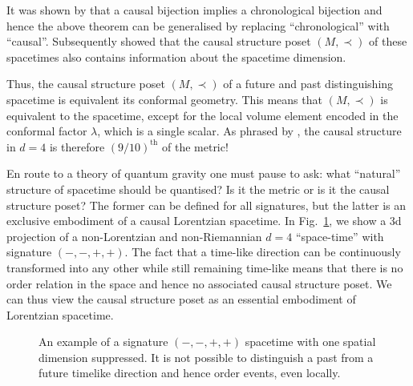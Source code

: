 It was shown by  \cite{levichev} that a causal bijection implies a
chronological bijection and hence the above theorem can be generalised
by replacing ``chronological'' with ``causal''. Subsequently \cite{ps} showed that the causal structure poset
$(M,\prec)$ of these spacetimes also contains information about the spacetime dimension. 

Thus, the causal structure poset $(M,\prec)$ of a future and past distinguishing spacetime is
equivalent its conformal geometry.  This means that $(M,\prec)$
is equivalent to the spacetime, except for the local volume  element encoded in the conformal
factor $\lambda$, which is a single scalar. As phrased by \cite{finkelstein}, the causal structure in $d=4$ 
is therefore $\left(9/10\right)^{\mathrm{th}}$ of the metric! 

En route to a theory of quantum gravity one must pause to ask:
what ``natural''  structure of spacetime  should be quantised? Is it the metric  or is it the causal structure poset?  The
former can be defined for all signatures,  but the latter is  an
exclusive  embodiment  of a causal Lorentzian spacetime. In Fig.~\ref{nonlor.fig}, we show a 3d projection of a  non-Lorentzian and
non-Riemannian $d=4$ ``space-time'' with  signature $(-,-,+,+)$. The fact that a time-like direction can be
continuously transformed into any other while still remaining time-like means that there is no order  relation in the space and
hence no associated causal structure poset. We can thus view  the  causal structure poset as an essential  embodiment of  Lorentzian spacetime.  

\begin{figure}[ht]
\centering {}
\caption{An example of a signature $(-,-,+,+)$ spacetime with one spatial dimension suppressed. It is
    not possible to distinguish a  past from a  future timelike direction and hence order events,  even locally.}
\label{nonlor.fig}
\end{figure}


